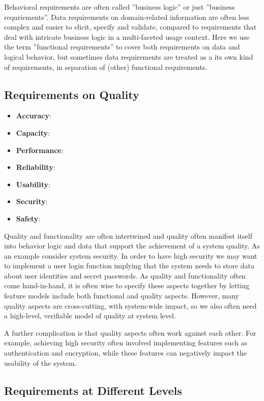 Behavioral requirements are often called ''business logic'' or just ''business requriements''. Data requirements on domain-related information are often less complex and easier to elicit, specify and validate, compared to requirements that deal with intricate business logic in a multi-faceted usage context. Here we use the term ''functional requirements'' to cover both requirements on data and logical behavior, but sometimes data requirements are treated as a its own kind of requirements, in separation of (other) functional requirements. 

\subsection*{Requirements on Quality}

\begin{itemize}
  \item \textbf{Accuracy}:
  \item \textbf{Capacity}:
  \item \textbf{Performance}:
  \item \textbf{Reliability}:
  \item \textbf{Usability}:
  \item \textbf{Security}:
  \item \textbf{Safety}:
\end{itemize}

Quality and functionality are often intertwined and quality often manifest itself into behavior logic and data that support the achievement of a system quality. As an example consider system security. In order to have high security we may want to implement a user login function implying that the system needs to store data about user identities and secret passwords. As quality and functionality often come hand-in-hand, it is often wise to specify these aspects together by letting feature models include both functional and quality aspects. However, many quality aspects are cross-cutting, with system-wide impact, so we also often need a high-level, verifiable model of quality at system level. 

A further complication is that quality aspects often work against each other. For example, achieving high security often involved implementing features such as authentication and encryption, while these features can negatively impact the usability of the system.


\subsection*{Requirements at Different Levels} 

